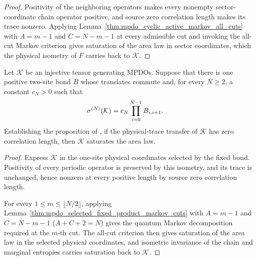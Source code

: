 \begin{proof}\leanok
    Positivity of the neighboring operators makes every nonempty
    sector-coordinate chain operator positive, and source zero correlation
    length makes its trace nonzero. Applying
    Lemma~\ref{thm:mpdo_cyclic_active_markov_all_cuts} with
    $A=m-1$ and $C=N-m-1$ at every admissible cut and invoking the all-cut
    Markov criterion gives saturation of the area law in sector coordinates,
    which the physical isometry of $F$ carries back to $\mathcal K$.
\end{proof}

\begin{lemma}
    \label{thm:mpdo_translation_invariant_commuting_form_zcl_sal}
    \leanok
    Let $\mathcal K$ be an injective tensor generating MPDOs. Suppose
    that there is one
    positive two-site bond $B$ whose translates commute and, for every
    $N\geq2$, a constant $c_N>0$ such that
    \begin{align}
        \sigma^{(N)}(\mathcal K)
         & =c_N\prod_{i=0}^{N-1}B_{i,i+1}.
        \notag
    \end{align}
    Establishing the proposition of
    \cite[Appendix~C.2, lines~1597--1619]{Cirac2016MPDO_arXiv}, if the
    physical-trace transfer of $\mathcal K$ has zero correlation length, then
    $\mathcal K$ saturates the area law.

\end{lemma}

\begin{proof}\leanok
    Express $\mathcal K$ in the one-site physical coordinates selected by
    the fixed bond. Positivity of every periodic operator is preserved by
    this isometry, and its trace is unchanged, hence nonzero at every
    positive length by source zero correlation length.

    For every $1\leq m\leq\lfloor N/2\rfloor$, applying
    Lemma~\ref{thm:mpdo_selected_fixed_product_markov_cuts} with
    $A=m-1$ and $C=N-m-1$ ($A+C+2=N$) gives the quantum Markov
    decomposition required at the $m$-th cut. The all-cut criterion then gives
    saturation of the area law in the selected physical coordinates, and
    isometric invariance of the chain and marginal entropies carries
    saturation back to $\mathcal K$.
\end{proof}

